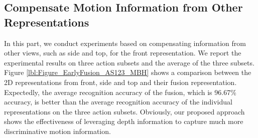 \documentclass[final,3p,times,twocolumn]{elsarticle}
\begin{document}
\begin{table}[h]
\begin{center}
	\end{center}
	\caption{\label{lbl:AS123ConfusionMatrix}Confusion matrices on three action subsets. Notice that action names are identified by indices of actions in table \ref{lbl:20actions}}
\end{table}

\subsection{Compensate Motion Information from Other Representations}

In this part, we conduct experiments based on compensating information from other views, such as side and top, for the front representation.
We report the experimental results on three action subsets and the average of the three subsets.
Figure \ref{lbl:Figure_EarlyFusion_AS123_MBH} shows a comparison between the 2D representations from front, side and top and their fusion representation.
Expectedly, the average recognition accuracy of the fusion, which is 96.67\% accuracy, is better than the average recognition accuracy of the individual representations on the three action subsets.
Obviously, our proposed approach shows the effectiveness of leveraging depth information to capture much more discriminative motion information.
\end{document}
